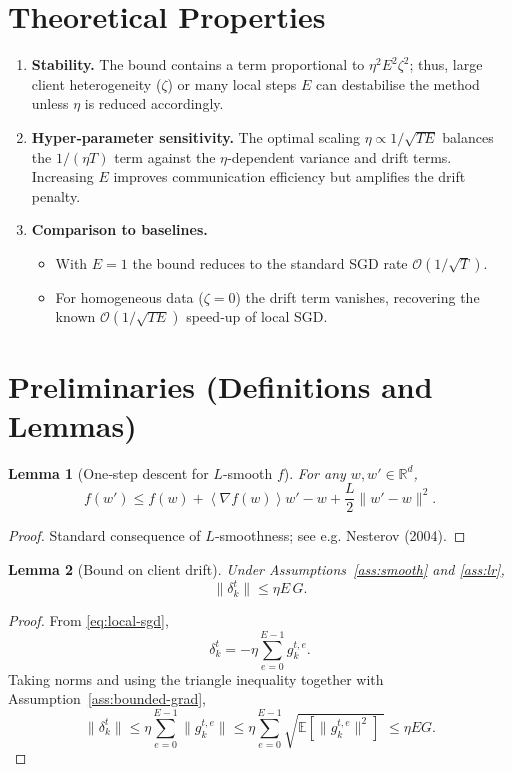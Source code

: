 \documentclass{article}
\newtheorem{lemma}{Lemma}
\newcommand{\E}{\mathbb{E}}
\newcommand{\R}{\mathbb{R}}
\newcommand{\inner}[1]{\left\langle #1 \right\rangle}
\begin{document}
\section*{Theoretical Properties}
\begin{enumerate}
\item \textbf{Stability.} The bound contains a term proportional to $\eta^{2}E^{2}\zeta^{2}$; thus, large client heterogeneity ($\zeta$) or many local steps $E$ can destabilise the method unless $\eta$ is reduced accordingly.
\item \textbf{Hyper‑parameter sensitivity.} The optimal scaling $\eta\propto1/\sqrt{TE}$ balances the $1/(\eta T)$ term against the $\eta$‑dependent variance and drift terms. Increasing $E$ improves communication efficiency but amplifies the drift penalty.
\item \textbf{Comparison to baselines.}
\begin{itemize}
\item With $E=1$ the bound reduces to the standard SGD rate $\mathcal{O}(1/\sqrt{T})$.
\item For homogeneous data ($\zeta=0$) the drift term vanishes, recovering the known $\mathcal{O}(1/\sqrt{TE})$ speed‑up of local SGD.
\end{itemize}
\end{enumerate}

\section*{Preliminaries (Definitions and Lemmas)}
\begin{lemma}[One‑step descent for $L$‑smooth $f$]
\label{lem:descent}
For any $w,w'\in\R^{d}$,
\[
f(w')\le f(w)+\inner{\nabla f(w)}{w'-w}+\frac{L}{2}\|w'-w\|^{2}.
\]
\end{lemma}
\begin{proof}
Standard consequence of $L$‑smoothness; see e.g. Nesterov (2004). \qedhere
\end{proof}

\begin{lemma}[Bound on client drift]
\label{lem:drift}
Under Assumptions~\ref{ass:smooth} and \ref{ass:lr},
\[
\|\delta_k^{t}\|\le \eta E\,G.
\]
\end{lemma}
\begin{proof}
From \eqref{eq:local-sgd},
\[
\delta_k^{t}= -\eta\sum_{e=0}^{E-1} g_{k}^{t,e}.
\]
Taking norms and using the triangle inequality together with Assumption~\ref{ass:bounded-grad},
\[
\|\delta_k^{t}\|\le \eta\sum_{e=0}^{E-1}\|g_{k}^{t,e}\|
               \le \eta\sum_{e=0}^{E-1}\sqrt{\E[\|g_{k}^{t,e}\|^{2}]\;}
               \le \eta E G .
\]
\qedhere
\end{proof}
\end{document}
